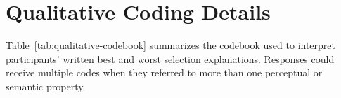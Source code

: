 \chapter{Qualitative Coding Details}
\label{app:qualitative-coding}

Table~\ref{tab:qualitative-codebook} summarizes the codebook used to interpret participants' written best and worst selection explanations. Responses could receive multiple codes when they referred to more than one perceptual or semantic property.



